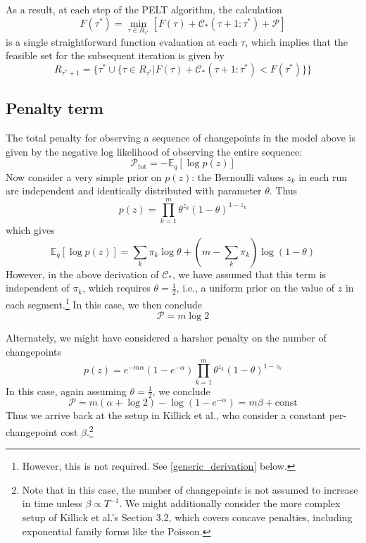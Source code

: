 \documentclass[11pt]{article}
\begin{document}
As a result, at each step of the PELT algorithm, the calculation
\begin{equation}
    F(\tau^*) = \min_{\tau \in R_{\tau^*}} [F(\tau) + \mathcal{C}_*(\tau + 1:\tau^*) + \mathcal{P}]
\end{equation}
is a single straightforward function evaluation at each $\tau$, which implies that the feasible set for the subsequent iteration is given by
\begin{equation}
    R_{\tau^* + 1} = \lbrace \tau^* \cup
    \lbrace
    \tau \in R_{\tau^*} \vert F(\tau) + \mathcal{C}_*(\tau + 1:\tau^*) <
    F(\tau^*)
    \rbrace \rbrace
\end{equation}

\subsection{Penalty term}
The total penalty for observing a sequence of changepoints in the model above is given by the negative log likelihood of observing the entire sequence:
\begin{equation}
    \mathcal{P}_\mathrm{tot} = -\mathbb{E}_q[\log p(z)]
\end{equation}
Now consider a very simple prior on $p(z)$: the Bernoulli values $z_k$ in each run are independent and identically distributed with parameter $\theta$. Thus
\begin{equation}
    p(z) = \prod_{k = 1}^m \theta^{z_k} (1 - \theta)^{1 - z_k}
\end{equation}
which gives
\begin{equation}
    \mathbb{E}_q[\log p(z)] = \sum_k \pi_k \log \theta
    + (m - \sum_k \pi_k)\log (1 - \theta)
\end{equation}
However, in the above derivation of $\mathcal{C}_*$, we have assumed that this term is independent of $\pi_k$, which requires $\theta = \frac{1}{2}$, i.e., a uniform prior on the value of $z$ in each segment.\footnote{However, this is not required. See \ref{generic_derivation} below.} In this case, we then conclude
\begin{equation}
    \mathcal{P} = m \log 2
\end{equation}

Alternately, we might have considered a harsher penalty on the number of changepoints
\begin{equation}
    \label{prior}
    p(z) = e^{-m\alpha}(1 - e^{-\alpha})
    \prod_{k = 1}^m \theta^{z_k} (1 - \theta)^{1 - z_k}
\end{equation}
In this case, again assuming $\theta = \frac{1}{2}$, we conclude
\begin{equation}
    \mathcal{P} = m(\alpha + \log 2) - \log (1 - e^{-\alpha}) = m\beta + \text{const}
\end{equation}
Thus we arrive back at the setup in Killick et al., who consider a constant per-changepoint cost $\beta$.\footnote{Note that in this case, the number of changepoints is not assumed to increase in time unless $\beta \propto T^{-1}$. We might additionally consider the more complex setup of Killick et al.'s Section 3.2, which covers concave penalties, including exponential family forms like the Poisson.}
\end{document}
